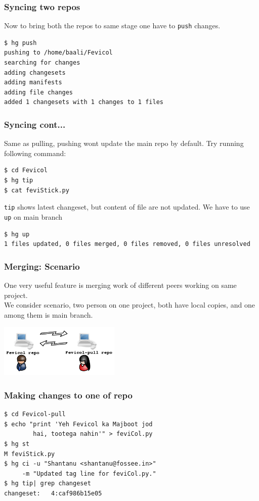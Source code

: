 \documentclass[14pt,compress]{beamer}
\newcounter{time}
\newcommand{\inctime}[1]{\addtocounter{time}{#1}{\tiny \thetime\ m}}
\newcommand{\typ}[1]{\lstinline{#1}}
\begin{document}
\begin{frame}[fragile]
  \frametitle{Syncing two repos}
  Now to bring both the repos to same stage one have to \typ{push} changes.
  \begin{lstlisting}
$ hg push 
pushing to /home/baali/Fevicol
searching for changes
adding changesets
adding manifests
adding file changes
added 1 changesets with 1 changes to 1 files
  \end{lstlisting} %
\end{frame}


\begin{frame}[fragile]
  \frametitle{Syncing cont...}
  Same as pulling, pushing wont update the main repo by default. Try running following command:
  \begin{lstlisting}
$ cd Fevicol
$ hg tip    
$ cat feviStick.py
  \end{lstlisting}
  \typ{tip} shows latest changeset, but content of file are not updated. We have to use \typ{up} on main branch
  \begin{lstlisting}
$ hg up
1 files updated, 0 files merged, 0 files removed, 0 files unresolved    
  \end{lstlisting} %
  \inctime{15}
\end{frame}

\begin{frame}[fragile]
  \frametitle{Merging: Scenario}
  One very useful feature is merging work of different peers working on same project.\\
  We consider scenario, two person on one project, both have local copies, and one among them is main branch.\\
  \begin{center}
    \includegraphics[height=1in, interpolate=true]{scenario}
  \end{center}  
\end{frame}


\begin{frame}[fragile]
  \frametitle{Making changes to one of repo}
  \begin{lstlisting}
$ cd Fevicol-pull
$ echo "print 'Yeh Fevicol ka Majboot jod 
        hai, tootega nahin'" > feviCol.py
$ hg st
M feviStick.py
$ hg ci -u "Shantanu <shantanu@fossee.in>" 
     -m "Updated tag line for feviCol.py."
$ hg tip| grep changeset
changeset:   4:caf986b15e05
  \end{lstlisting} %
\end{frame}
\end{document}
